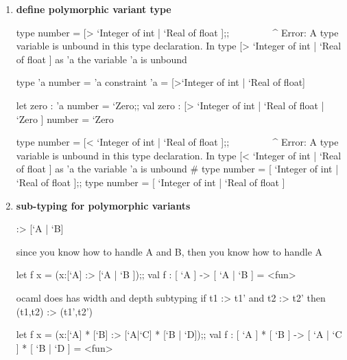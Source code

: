 \begin{enumerate}
\begin{alternate}
test0 `Test;;
Characters 6-11:
  test0 `Test;;
        ^^^^^
Error: This expression has type [> `Test ]
       but an expression was expected of type [< `Int of 'a ]
       The second variant type does not allow tag(s) `Test
\end{alternate}
     






  \item \textbf{define polymorphic variant type }

\begin{alternate}
type number = [> `Integer of int | `Real of float ];;
       ^^^^^^^^^^^^^^^^^^^^^^^^^^^^^^^^^^^^^^^^^^^^^^
Error: A type variable is unbound in this type declaration.
In type [> `Integer of int | `Real of float ] as 'a
the variable 'a is unbound

type 'a number = 'a constraint 'a = [>`Integer of int | `Real of float]

let zero : 'a number = `Zero;;
val zero : [> `Integer of int | `Real of float | `Zero ] number = `Zero


type number = [< `Integer of int | `Real of float ];;
       ^^^^^^^^^^^^^^^^^^^^^^^^^^^^^^^^^^^^^^^^^^^^^^
Error: A type variable is unbound in this type declaration.
In type [< `Integer of int | `Real of float ] as 'a
the variable 'a is unbound
# type number = [ `Integer of int | `Real of float ];;
type number = [ `Integer of int | `Real of float ]


\end{alternate}

  \item \textbf{sub-typing for polymorphic variants}

\begin{ocamlcode}
  [`A] :> [`A | `B]
\end{ocamlcode}  
since you know how to handle A and B, then you know how to handle A

\begin{alternate}
let f x = (x:[`A] :> [`A | `B ]);;
val f : [ `A ] -> [ `A | `B ] = <fun>
\end{alternate}

ocaml does has width and depth subtyping
if t1 :> t1' and t2 :> t2' then (t1,t2) :> (t1',t2')

\begin{alternate}
let f x = (x:[`A] * [`B] :> [`A|`C] * [`B | `D]);; 
val f : [ `A ] * [ `B ] -> [ `A | `C ] * [ `B | `D ] = <fun>



\end{alternate}
\end{enumerate}
